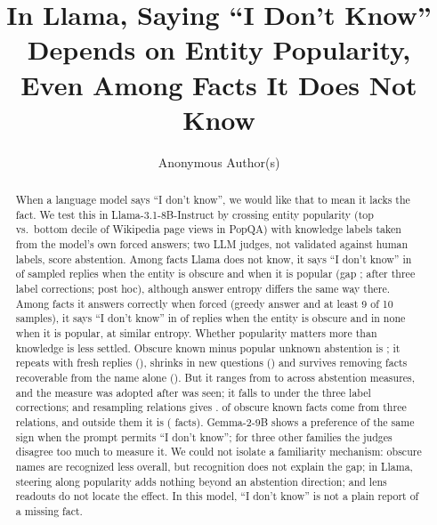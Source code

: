 \documentclass[manuscript,screen,review,anonymous,nonacm]{acmart}
\newcommand{\idk}{``I don't know''}
\begin{document}
\title{In Llama, Saying ``I Don't Know'' Depends on Entity Popularity, Even Among Facts It Does Not Know}
\author{Anonymous Author(s)}

\begin{abstract}
When a language model says \idk, we would like that to mean it lacks the fact. We test this in Llama-3.1-8B-Instruct by crossing entity popularity (top vs.\ bottom decile of Wikipedia page views in PopQA) with knowledge labels taken from the model's own forced answers; two LLM judges, not validated against human labels, score abstention. Among facts Llama does not know, it says \idk{} in \tcObsUnkAbs{} of sampled replies when the entity is obscure and \tcPopUnkAbs{} when it is popular (gap \rcUnk{} \rcUnkCI; \rcUnkJoint{} \rcUnkJointCI{} after three label corrections; post hoc), although answer entropy differs the same way there. Among facts it answers correctly when forced (greedy answer and at least 9 of 10 samples), it says \idk{} in \tcObsKnownAbs{} of replies when the entity is obscure and in none when it is popular, at similar entropy. Whether popularity matters more than knowledge is less settled. Obscure known minus popular unknown abstention is \hmLlamaDiff{} \hmLlamaDiffCI; it repeats with fresh replies (\frDiff), shrinks in new questions (\nqDiff) and survives removing facts recoverable from the name alone (\ncDiff). But it ranges from \hjLlamaDiff{} to \faLlamaRegexDiff{} across abstention measures, and the \hmLlamaDiff{} measure was adopted after \hjLlamaDiff{} was seen; it falls to \rcJoint{} \rcJointCI{} under the three label corrections; and resampling relations gives \rcClusCI. \rcTopThree{} of \gsObsKnownTotal{} obscure known facts come from three relations, and outside them it is \msOutDiff{} (\msOutKnownN{} facts). Gemma-2-9B shows a preference of the same sign when the prompt permits \idk; for three other families the judges disagree too much to measure it. We could not isolate a familiarity mechanism: obscure names are recognized less overall, but recognition does not explain the gap; in Llama, steering along popularity adds nothing beyond an abstention direction; and lens readouts do not locate the effect. In this model, \idk{} is not a plain report of a missing fact.
\end{abstract}


\maketitle
\end{document}
